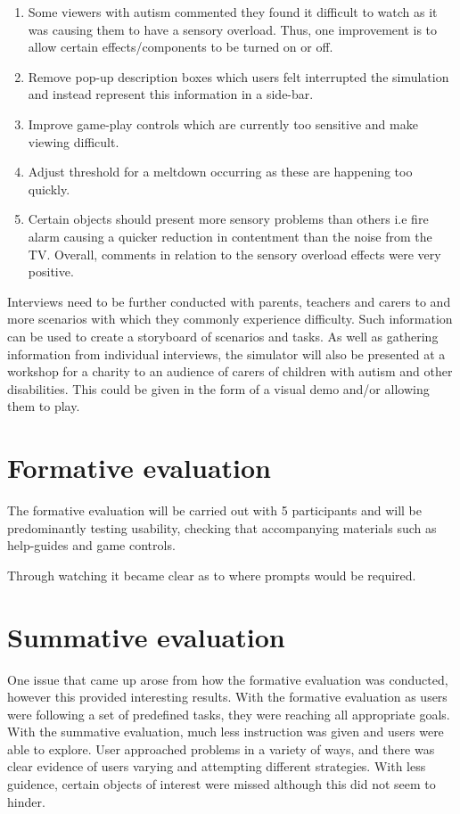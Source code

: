\documentclass[11pt]{report}
\begin{document}
\begin{enumerate}
\item Some viewers with autism commented they found it difficult to watch as it was causing them to have a sensory overload. Thus, one improvement is to allow certain effects/components to be turned on or off.
\item Remove pop-up description boxes which users felt interrupted the simulation and instead represent this information in a side-bar.
\item Improve game-play controls which are currently too sensitive and make viewing difficult.
\item Adjust threshold for a meltdown occurring as these are happening too quickly.
\item Certain objects should present more sensory problems than others i.e fire alarm causing a quicker reduction in contentment than the noise from the TV. Overall, comments in relation to the sensory overload effects were very positive.
\end{enumerate}

Interviews need to be further conducted with parents, teachers and carers to and more scenarios with which they commonly experience difficulty. Such information can be used to create a storyboard of scenarios and tasks. As
well as gathering information from individual interviews, the simulator will also be presented at a workshop for a charity to an audience of carers of children with autism and other disabilities. This could be given in the form of a visual demo and/or allowing them to play.



\chapter{Formative evaluation}
The formative evaluation will be carried out with 5 participants and will be predominantly testing usability, checking that accompanying materials such as help-guides and game controls.

Through watching it became clear as to where prompts would be required. 

\chapter{Summative evaluation}

One issue that came up arose from how the formative evaluation was conducted, however this provided interesting results. With the formative evaluation as users were following a set of predefined tasks, they were reaching all appropriate goals. With the summative evaluation, much less instruction was given and users were able to explore.
User approached problems in a variety of ways, and there was clear evidence of users varying and attempting different strategies. With less guidence, certain objects of interest were missed although this did not seem to hinder.
\end{document}
